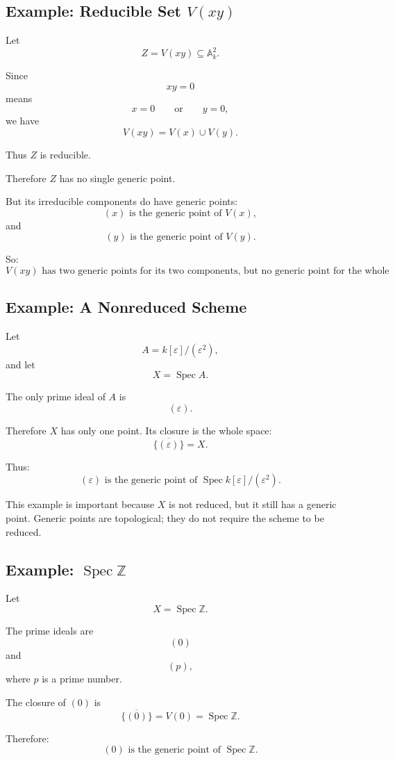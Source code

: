 \documentclass[12pt,a4paper]{article}
\theoremstyle{notespace}
\begin{document}
\subsection{Example: Reducible Set \(V(xy)\)}

Let
\[
Z=V(xy)\subseteq \mathbb A^2_k.
\]

Since
\[
xy=0
\]
means
\[
x=0
\qquad\text{or}\qquad
y=0,
\]
we have
\[
V(xy)=V(x)\cup V(y).
\]

Thus \(Z\) is reducible.

Therefore \(Z\) has no single generic point.

But its irreducible components do have generic points:
\[
\boxed{
	(x)\text{ is the generic point of }V(x),
}
\]
and
\[
\boxed{
	(y)\text{ is the generic point of }V(y).
}
\]

So:
\[
\boxed{
	V(xy)\text{ has two generic points for its two components, but no generic point for the whole set.}
}
\]

\subsection{Example: A Nonreduced Scheme}

Let
\[
A=k[\varepsilon]/(\varepsilon^2),
\]
and let
\[
X=\operatorname{Spec} A.
\]

The only prime ideal of \(A\) is
\[
(\varepsilon).
\]

Therefore \(X\) has only one point. Its closure is the whole space:
\[
\overline{\{(\varepsilon)\}}=X.
\]

Thus:
\[
\boxed{
	(\varepsilon)\text{ is the generic point of }\operatorname{Spec} k[\varepsilon]/(\varepsilon^2).
}
\]

This example is important because \(X\) is not reduced, but it still has a generic point. Generic points are topological; they do not require the scheme to be reduced.

\subsection{Example: \(\operatorname{Spec}\mathbb Z\)}

Let
\[
X=\operatorname{Spec}\mathbb Z.
\]

The prime ideals are
\[
(0)
\]
and
\[
(p),
\]
where \(p\) is a prime number.

The closure of \((0)\) is
\[
\overline{\{(0)\}}=V(0)=\operatorname{Spec}\mathbb Z.
\]

Therefore:
\[
\boxed{
	(0)\text{ is the generic point of }\operatorname{Spec}\mathbb Z.
}
\]
\end{document}

